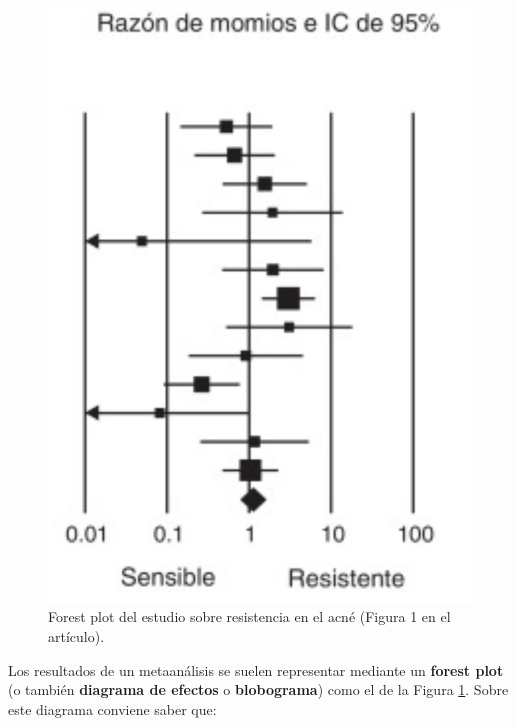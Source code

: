 \documentclass[
]{book}
\theoremstyle{definition}
\theoremstyle{definition}
\theoremstyle{definition}
\theoremstyle{definition}
\theoremstyle{remark}
\begin{document}
\begin{figure}

{\centering \includegraphics[width=0.4\linewidth]{INREMDN_files/figure-html/blob} 

}

\caption{Forest plot del estudio sobre resistencia en el acné (Figura 1 en el artículo).}\label{fig:blob}
\end{figure}

Los resultados de un metaanálisis se suelen representar mediante un \textbf{forest plot} (o también \textbf{diagrama de efectos} o \textbf{blobograma}) como el de la Figura \ref{fig:blob}. Sobre este diagrama conviene saber que:
\end{document}
